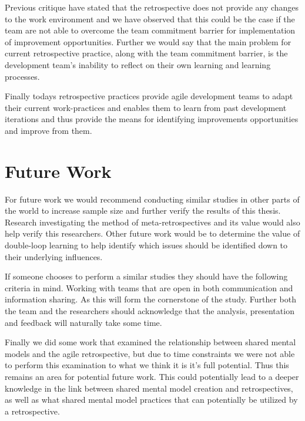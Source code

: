 Previous critique \cite{Drury2012} have stated that the retrospective does not provide any changes to the work environment and we have observed that this could be the case if the team are not able to overcome the team commitment barrier for implementation of improvement opportunities. Further we would say that the main problem for current retrospective practice, along with the team commitment barrier, is the development team's inability to reflect on their own learning and learning processes. 

Finally todays retrospective practices provide agile development teams to adapt their current work-practices and enables them to learn from past development iterations and thus provide the means for identifying improvements opportunities and improve from them. 

\section{Future Work}
For future work we would recommend conducting similar studies in other parts of the world to increase sample size and further verify the results of this thesis. Research investigating the method of meta-retrospectives and its value would also help verify this researchers. Other future work would be to determine the value of double-loop learning to help identify which issues should be identified down to their underlying influences. 

If someone chooses to perform a similar studies they should have the following criteria in mind. Working with teams that are open in both communication and information sharing. As this will form the cornerstone of the study. Further both the team and the researchers should acknowledge that the analysis, presentation and feedback will naturally take some time.

Finally we did some work that examined the relationship between shared mental models and the agile retrospective, but due to time constraints we were not able to perform this examination to what we think it is it's full potential. Thus this remains an area for potential future work. This could potentially lead to a deeper knowledge in the link between shared mental model creation and retrospectives, as well as what shared mental model practices that can potentially be utilized by a retrospective. 


